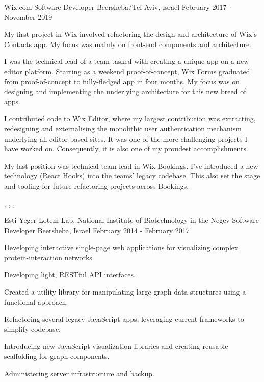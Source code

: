 
\begin{cventries}
  \cventry
    {Wix.com}
    {Software Developer}
    {Beersheba/Tel Aviv, Israel}
    {February 2017 - November 2019}
    {
      \begin{cvitems}
        \item {My first project in Wix involved refactoring the design and architecture of Wix’s Contacts app. My focus was mainly on front-end components and architecture.}
        \item {I was the technical lead of a team tasked with creating a unique app on a new editor platform. Starting as a weekend proof-of-concept, Wix Forms graduated from proof-of-concept to fully-fledged app in four months. My focus was on designing and implementing the underlying architecture for this new breed of apps.}
        \item {I contributed code to Wix Editor, where my largest contribution was extracting, redesigning and externalising the monolithic user authentication mechanism underlying all editor-based sites. It was one of the more challenging projects I have worked on. Consequently, it is also one of my proudest accomplishments.}
        \item {My last position was technical team lead in Wix Bookings. I've introduced a new technology (React Hooks) into the teams' legacy codebase. This also set the stage and tooling for future refactoring projects across Bookings.}
      \end{cvitems}
     }

    \begin{cvskills}
       {}
       {, , , }
    \end{cvskills}

  \cventry
    {Esti Yeger-Lotem Lab, National Institute of Biotechnology in the Negev}
    {Software Developer}
    {Beersheba, Israel}
    {February 2014 - February 2017}
    {
      \begin{cvitems}
        \item {Developing interactive single-page web applications for visualizing complex protein-interaction networks.}
        \item {Developing light, RESTful API interfaces.}
        \item {Created a utility library for manipulating large graph data-structures using a functional approach.}
        \item {Refactoring several legacy JavaScript apps, leveraging current frameworks to simplify codebase.}
        \item {Introducing new JavaScript visualization libraries and creating reusable scaffolding for graph components.}
        \item {Administering server infrastructure and backup.}
      \end{cvitems}
    }
    

\end{cventries}
